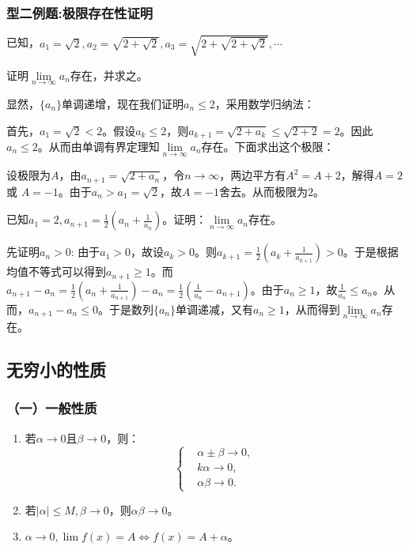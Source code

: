     \subsubsection*{型二例题:极限存在性证明}
    \begin{example}
        已知，$a_1=\sqrt{2}, a_2=\sqrt{2+\sqrt{2}}, a_3=\sqrt{2+\sqrt{2+\sqrt{2}}}, \cdots$

        证明$\lim\limits_{n \to \infty}a_n$存在，并求之。
    \end{example}
    \begin{solution}
        显然，$ \{a_n\} $单调递增，现在我们证明$ a_n \leq 2$，采用数学归纳法：

        首先，$ a_1=\sqrt{2}<2 $。假设$a_k\leq 2$，则$a_{k+1} =\sqrt{2+a_k}\leq \sqrt{2+2}=2$。因此 $a_n \leq 2$。从而由单调有界定理知$\lim\limits_{n \to \infty}a_n$存在。下面求出这个极限：

        设极限为$A$，由$a_{n+1}=\sqrt{2+a_n}$，令$ n \to \infty $，两边平方有$ A^2=A+2 $，解得$ A=2 $或 $ A=-1 $。由于$a_n>a_1=\sqrt{2}$，故$ A=-1 $舍去。从而极限为$ 2 $。
    \end{solution}

    \begin{example}
        已知$ a_1=2, a_{n+1}=\displaystyle\frac{1}{2}(a_n+\displaystyle\frac{1}{a_n})$。证明：$\lim\limits_{n \to \infty}a_n$存在。
    \end{example}
    \begin{solution}
        先证明$ a_n>0 $:
        由于$a_1>0$，故设$a_k>0$。则$a_{k+1}=\displaystyle\frac{1}{2}(a_k+\displaystyle\frac{1}{a_{k+1}})>0$。于是根据均值不等式可以得到$a_{n+1} \geq 1$。而$a_{n+1}-a_n=\displaystyle\frac{1}{2}(a_n+\displaystyle\frac{1}{a_{n+1}})-a_n=\displaystyle\frac{1}{2}(\displaystyle\frac{1}{a_n}-a_{n+1})$。由于$a_{n} \geq 1$，故$\displaystyle\frac{1}{a_n} \leq a_n$。从而，$a_{n+1}-a_n \leq 0$。于是数列$ \{a_n\} $单调递减，又有$a_n \geq 1$，从而得到$\lim\limits_{n \to \infty}a_n$存在。
    \end{solution}

    \subsection{无穷小的性质}
    \subsubsection*{（一）一般性质}
    \begin{enumerate}
        \item 若$ \alpha \to 0 $且$ \beta \to 0 $，则：
        \[ \left\{
            \begin{array}{rl}
                & \alpha \pm \beta  \to 0,\\
                & k \alpha  \to 0,\\
                & \alpha \beta  \to 0.
            \end{array} \right. \]
        \item 若$ \vert \alpha \vert \leq M, \beta \to 0$，则$\alpha \beta \to 0$。
        \item $\alpha \to 0, \lim\limits f(x)=A \Leftrightarrow f(x)=A+\alpha$。
    \end{enumerate}
